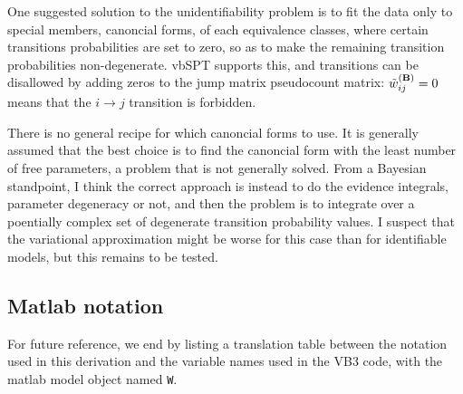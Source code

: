 One suggested solution to the unidentifiability problem is to fit the
data only to special members, canoncial
forms\cite{Kienker1989,Bruno2005}, of each equivalence classes, where
certain transitions probabilities are set to zero, so as to make the
remaining transition probabilities non-degenerate. vbSPT supports
this, and transitions can be disallowed by adding zeros to the jump
matrix pseudocount matrix: $\tilde w_{ij}^{(\mathbf{B})}=0$ means that
the $i\to j$ transition is forbidden. 

There is no general recipe for which canoncial forms to use. It is
generally assumed that the best choice is to find the canoncial form
with the least number of free parameters\cite{Kienker1989,Bruno2005},
a problem that is not generally solved. From a Bayesian standpoint, I
think the correct approach is instead to do the evidence integrals,
parameter degeneracy or not, and then the problem is to integrate over
a poentially complex set of degenerate transition probability
values. I suspect that the variational approximation might be worse
for this case than for identifiable models, but this remains to be
tested.




\subsection{Matlab notation}
\label{Sec:matlabNotation}
For future reference, we end by listing a translation table between
the notation used in this derivation and the variable names used in
the VB3 code, with the matlab model object named \texttt{W}.

